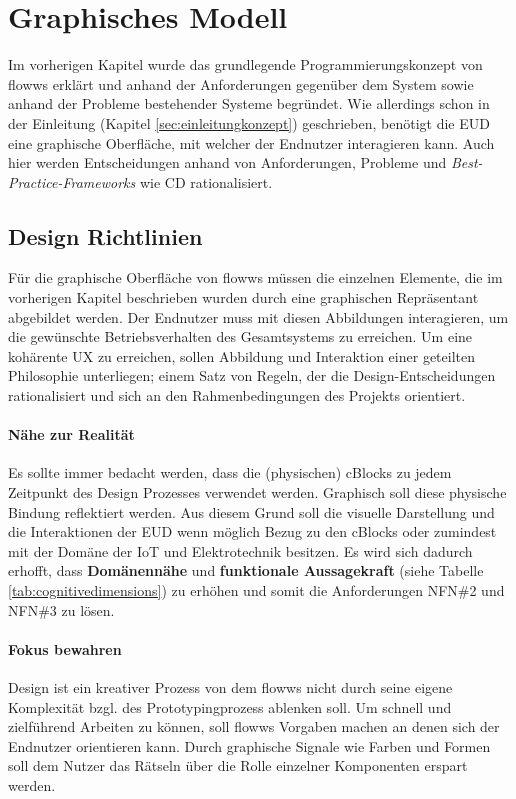 \section{Graphisches Modell}
Im vorherigen Kapitel wurde das grundlegende Programmierungskonzept von flowws erklärt und anhand der Anforderungen gegenüber dem System sowie anhand der Probleme bestehender Systeme begründet. Wie allerdings schon in der Einleitung (Kapitel \ref{sec:einleitungkonzept}) geschrieben, benötigt die \ac{EUD} eine graphische Oberfläche, mit welcher der Endnutzer interagieren kann. Auch hier werden Entscheidungen anhand von Anforderungen, Probleme und \textit{Best-Practice-Frameworks} wie \ac{CD} rationalisiert.
 
\subsection{Design Richtlinien}
Für die graphische Oberfläche von flowws müssen die einzelnen Elemente, die im vorherigen Kapitel beschrieben wurden durch eine graphischen Repräsentant abgebildet werden. Der Endnutzer muss mit diesen Abbildungen interagieren, um die gewünschte Betriebsverhalten des Gesamtsystems zu erreichen. Um eine kohärente \ac{UX} zu erreichen, sollen Abbildung und Interaktion einer geteilten Philosophie unterliegen; einem Satz von Regeln, der die Design-Entscheidungen rationalisiert und sich an den Rahmenbedingungen des Projekts orientiert.

\paragraph{Nähe zur Realität} Es sollte immer bedacht werden, dass die (physischen) cBlocks zu jedem Zeitpunkt des Design Prozesses verwendet werden. Graphisch soll diese physische Bindung reflektiert werden. Aus diesem Grund soll die visuelle Darstellung und die Interaktionen der \ac{EUD} wenn möglich Bezug zu den cBlocks oder zumindest mit der Domäne der \ac{IoT} und Elektrotechnik besitzen. Es wird sich dadurch erhofft, dass \textbf{Domänennähe} und \textbf{funktionale Aussagekraft} (siehe Tabelle \ref{tab:cognitivedimensions}) zu erhöhen und somit die Anforderungen NFN\#2 und NFN\#3 zu lösen.

\paragraph{Fokus bewahren} Design ist ein kreativer Prozess von dem flowws nicht durch seine eigene Komplexität bzgl. des Prototypingprozess ablenken soll. Um schnell und zielführend Arbeiten zu können, soll flowws Vorgaben machen an denen sich der Endnutzer orientieren kann. Durch graphische Signale wie Farben und Formen soll dem Nutzer das Rätseln über die Rolle einzelner Komponenten erspart werden.

